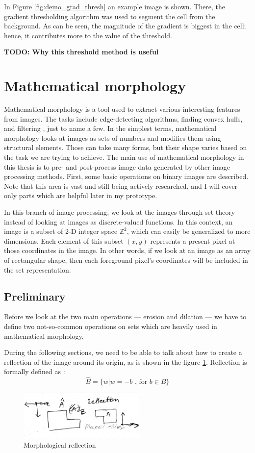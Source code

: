 \documentclass[
  digital,     %
  oneside,     %
  nosansbold,  %
  nocolorbold, %
  lof,         %
  lot,         %
]{fithesis4}
\newcommand*{\Z}{\ensuremath{\mathbb{Z}}}
\begin{document}
In Figure \ref{fig:demo_grad_thresh} an example image is shown. There, the
gradient thresholding algorithm was used to segment the cell from the
background. As can be seen, the magnitude of the gradient is biggest in the
cell; hence, it contributes more to the value of the threshold. 

\textbf{TODO: Why this threshold method is useful}

\section{Mathematical morphology}

Mathematical morphology is a tool used to extract various interesting features
from images. The tasks include edge-detecting algorithms, finding convex hulls, and filtering
, just to name a few. In the simplest terms,
mathematical morphology looks at images as sets of numbers and modifies them using structural elements. Those can take many forms, but their shape varies based on the task we are trying
to achieve. The main use of mathematical morphology in this thesis is
to pre- and post-process image data generated by other image processing methods.
First, some basic operations on binary images are described. Note that
this area is vast and still being actively researched, and I will cover only parts which are helpful later in my
prototype.

In this branch of image processing, we look at the images through set theory
instead of looking at images as discrete-valued functions. In this context, an
image is a subset of 2-D integer space $\Z^2$, which can easily be generalized
to more dimensions. Each element of this subset $(x, y)$ represents a present
pixel at those coordinates in the image. In other words, if we look at an image
as an array of rectangular shape, then each foreground pixel's coordinates will
be included in the set representation.

\subsection{Preliminary}
Before we look at the two main operations --- erosion and dilation --- we have to
define two not-so-common operations on sets which are heavily used in
mathematical morphology.

During the following sections, we need to be able to talk about how to create a
reflection of the image around its origin, as is shown in the figure
\ref{fig:morp_refl}. Reflection is formally defined as \parencite{gonzalez2002}:
$$\hat{B} = \{w | w=-b \text{ , for } b \in B\}$$
\begin{figure}
    \begin{center}
        \includegraphics[width=6.3cm]{resources/morph_reflection.jpg}
    \end{center}
    \caption{Morphological reflection} %
    \label{fig:morp_refl}
\end{figure}
\end{document}
